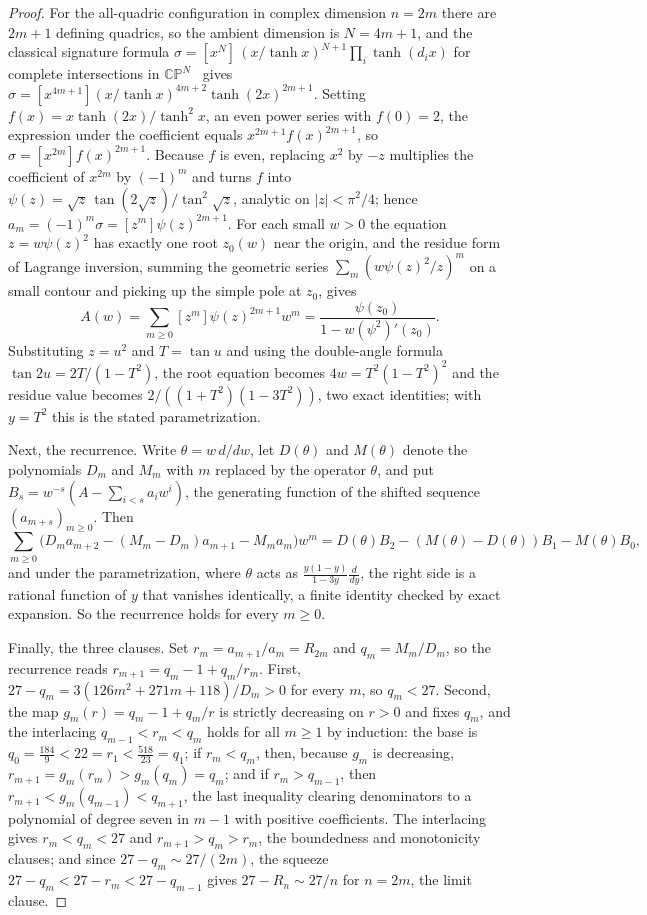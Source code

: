 \documentclass[11pt]{article}
\theoremstyle{definition}
\begin{document}
\begin{proof}
For the all-quadric configuration in complex dimension $n=2m$ there are $2m+1$ defining quadrics, so the ambient dimension is $N=4m+1$, and the classical signature formula $\sigma=[x^{N}]\,(x/\tanh x)^{N+1}\prod_i\tanh(d_ix)$ for complete intersections in $\mathbb{CP}^N$~\cite{Hir66} gives $\sigma=[x^{4m+1}](x/\tanh x)^{4m+2}\tanh(2x)^{2m+1}$.  Setting $f(x)=x\tanh(2x)/\tanh^2x$, an even power series with $f(0)=2$, the expression under the coefficient equals $x^{2m+1}f(x)^{2m+1}$, so $\sigma=[x^{2m}]f(x)^{2m+1}$.  Because $f$ is even, replacing $x^2$ by $-z$ multiplies the coefficient of $x^{2m}$ by $(-1)^m$ and turns $f$ into $\psi(z)=\sqrt z\,\tan(2\sqrt z)/\tan^2\!\sqrt z$, analytic on $|z|<\pi^2/4$; hence $a_m=(-1)^m\sigma=[z^m]\psi(z)^{2m+1}$.  For each small $w>0$ the equation $z=w\psi(z)^2$ has exactly one root $z_0(w)$ near the origin, and the residue form of Lagrange inversion, summing the geometric series $\sum_m(w\psi(z)^2/z)^m$ on a small contour and picking up the simple pole at $z_0$, gives
\[
A(w)=\sum_{m\ge0}[z^m]\psi(z)^{2m+1}w^m=\frac{\psi(z_0)}{1-w(\psi^2)'(z_0)}.
\]
Substituting $z=u^2$ and $T=\tan u$ and using the double-angle formula $\tan2u=2T/(1-T^2)$, the root equation becomes $4w=T^2(1-T^2)^2$ and the residue value becomes $2/((1+T^2)(1-3T^2))$, two exact identities; with $y=T^2$ this is the stated parametrization.

Next, the recurrence.  Write $\theta=w\,d/dw$, let $D(\theta)$ and $M(\theta)$ denote the polynomials $D_m$ and $M_m$ with $m$ replaced by the operator $\theta$, and put $B_s=w^{-s}(A-\sum_{i<s}a_iw^i)$, the generating function of the shifted sequence $(a_{m+s})_{m\ge0}$.  Then
\[
\sum_{m\ge0}\bigl(D_ma_{m+2}-(M_m-D_m)a_{m+1}-M_ma_m\bigr)w^m
=D(\theta)B_2-(M(\theta)-D(\theta))B_1-M(\theta)B_0,
\]
and under the parametrization, where $\theta$ acts as $\frac{y(1-y)}{1-3y}\frac{d}{dy}$, the right side is a rational function of $y$ that vanishes identically, a finite identity checked by exact expansion.  So the recurrence holds for every $m\ge0$.

Finally, the three clauses.  Set $r_m=a_{m+1}/a_m=R_{2m}$ and $q_m=M_m/D_m$, so the recurrence reads $r_{m+1}=q_m-1+q_m/r_m$.  First, $27-q_m=3(126m^2+271m+118)/D_m>0$ for every $m$, so $q_m<27$.  Second, the map $g_m(r)=q_m-1+q_m/r$ is strictly decreasing on $r>0$ and fixes $q_m$, and the interlacing $q_{m-1}<r_m<q_m$ holds for all $m\ge1$ by induction: the base is $q_0=\tfrac{184}9<22=r_1<\tfrac{518}{23}=q_1$; if $r_m<q_m$, then, because $g_m$ is decreasing, $r_{m+1}=g_m(r_m)>g_m(q_m)=q_m$; and if $r_m>q_{m-1}$, then $r_{m+1}<g_m(q_{m-1})<q_{m+1}$, the last inequality clearing denominators to a polynomial of degree seven in $m-1$ with positive coefficients.  The interlacing gives $r_m<q_m<27$ and $r_{m+1}>q_m>r_m$, the boundedness and monotonicity clauses; and since $27-q_m\sim27/(2m)$, the squeeze $27-q_m<27-r_m<27-q_{m-1}$ gives $27-R_n\sim27/n$ for $n=2m$, the limit clause.
\end{proof}
\end{document}
